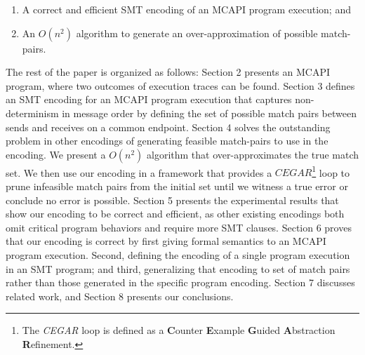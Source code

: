 \begin{enumerate}
\item A correct and efficient SMT encoding of an MCAPI program execution; and
\item  An $O(n^2)$ algorithm to generate an over-approximation of possible match-pairs.
\end{enumerate}

The rest of the paper is organized as follows:
Section 2 presents an MCAPI program, where two outcomes of execution traces can be found. Section 3 defines an SMT encoding for an MCAPI program execution that captures non-determinism in message order by defining the set of possible match pairs between sends and receives on a common endpoint. Section 4 solves the outstanding problem in other encodings of generating feasible match-pairs to use in the encoding. We present a $O(n^2)$ algorithm that over-approximates the true match set. We then use our encoding in a framework that provides a $\mathit{CEGAR}$\footnote{The \textit{CEGAR} loop is defined as a \textbf{C}ounter \textbf{E}xample \textbf{G}uided \textbf{A}bstraction \textbf{R}efinement.} loop to prune infeasible match pairs from the initial set until we witness a true error or conclude no error is possible. Section 5 presents the experimental results that show our encoding to be correct and efficient, as other existing encodings both omit critical program behaviors and require more SMT clauses. Section 6 proves that our encoding is correct by first giving formal semantics to an MCAPI program execution. Second, defining the encoding of a single program execution in an SMT program; and third, generalizing that encoding to set of match pairs rather than those generated in the specific program encoding. Section 7 discusses related
work, and Section 8 presents our conclusions.

